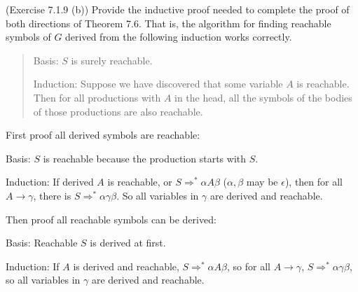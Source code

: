 \documentclass[10pt]{homework}
\begin{document}
\begin{problem} (Exercise 7.1.9 (b)) Provide the inductive proof needed to
  complete the proof of both directions of Theorem 7.6.
  That is, the algorithm for finding reachable symbols of $G$ derived from the
  following induction works correctly.

  \begin{quote}
    Basis: $S$ is surely reachable.

    Induction: Suppose we have discovered that some variable $A$ is reachable.
    Then for all productions with $A$ in the head, all the symbols of the bodies
    of those productions are also reachable.
  \end{quote}
\end{problem}

\begin{solution}
    First proof all derived symbols are reachable:

    Basis: $S$ is reachable because the production starts with $S$.

    Induction: If derived $A$ is reachable, or $S\Rightarrow ^{*}\alpha A \beta$ ($\alpha,\beta$ may be $\epsilon$), then for all $A\rightarrow \gamma$, there is $S\Rightarrow ^{*}\alpha\gamma\beta$. So all variables in $\gamma$ are derived and reachable.

    Then proof all reachable symbols can be derived:

    Basis: Reachable $S$ is derived at first.

    Induction: If $A$ is derived and reachable, $S\Rightarrow ^{*}\alpha A\beta$, so for all $A\rightarrow \gamma$, $S\Rightarrow ^{*}\alpha\gamma\beta$, so all variables in $\gamma$ are derived and reachable.
\end{solution}

\end{document}
